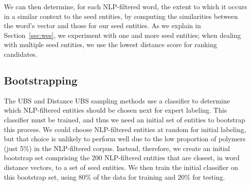 We can then determine, for each NLP-filtered word, the extent to which it occurs
in a similar context to the seed entities, by computing the similarities
between the word's vector and those for our seed entities. 
As we explain in Section~\ref{sec:wes}, we experiment with one and more seed entities; 
when dealing with multiple seed entities,
we use the lowest distance score for ranking candidates.



\subsection{Bootstrapping}\label{sec:bootstrap}
The UBS and Distance UBS sampling methods use a classifier to 
determine which NLP-filtered entities should be chosen next for expert labeling.
This classifier must be trained, and thus we need an initial set of entities to bootstrap this process.
We could choose NLP-filtered entities at random for initial labeling, 
but that choice is unlikely to perform well due to the low proportion of polymers (just 5\%) in the NLP-filtered corpus.
Instead, therefore, we create an initial bootstrap set comprising the 200 NLP-filtered entities 
that are closest, in word distance vectors, to a set of seed entities.
We then train the initial classifier on this bootstrap set, using 80\% of the data for training and 20\% for testing.

